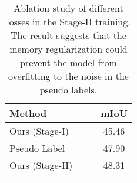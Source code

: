 \documentclass{article}
\begin{document}
\begin{table}[tbp]
\small
\begin{center}
{
\setlength{\tabcolsep}{14pt}
\begin{tabular}{l|c|c|c}
\shline
Method &  &   & mIoU \\
\hline
Ours (Stage-I) &  & &  45.46 \\
Pseudo Label &  & &  47.90\\
Ours (Stage-II) &  &  &  48.31 \\
\shline
\end{tabular}}
\end{center}
\vspace{-2.5mm}
\caption{Ablation study of different losses in the Stage-II training. The result suggests that the memory regularization could prevent the model from overfitting to the noise in the pseudo labels.} \label{table:stage2}
\end{table}
\end{document}
